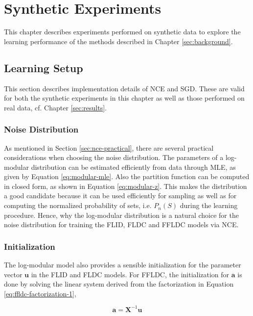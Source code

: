 \chapter{Synthetic Experiments}
\label{sec:synthetic}

This chapter describes experiments performed on synthetic data to explore the learning performance of the methods described in Chapter \ref{sec:background}.

\section{Learning Setup}

This section describes implementation details of NCE and SGD. These are valid for both the synthetic experiments in this chapter as well as those performed on real data, cf. Chapter \ref{sec:results}.

\subsection{Noise Distribution}

As mentioned in Section \ref{sec:nce-practical}, there are several practical considerations when choosing the noise distribution. The parameters of a log-modular distribution can be estimated efficiently from data through MLE, as given by Equation \eqref{eq:modular-mle}. Also the partition function can be computed in closed form, as shown in Equation \eqref{eq:modular-z}. This makes the distribution a good candidate because it can be used efficiently for sampling as well as for computing the normalized probability of sets, i.e. $P_{n}(S)$ during the learning procedure. Hence, why the log-modular distribution is a natural choice for the noise distribution for training the FLID, FLDC and FFLDC models via NCE.



\subsection{Initialization}

The log-modular model also provides a sensible initialization for the parameter vector $\mathbf{u}$ in the FLID and FLDC models. For FFLDC, the initialization for $\mathbf{a}$ is done by solving the linear system derived from the factorization in Equation \eqref{eq:ffldc-factorization-1},

\begin{equation}
  \label{eq:modular_features}
  \mathbf{a} = \mathbf{X}^{-1}\mathbf{u}
\end{equation}

